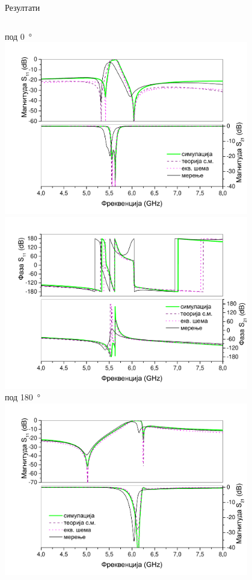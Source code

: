 \documentclass{beamer}
\begin{document}
\begin{frame}[t]{Резултати}
   \begin{columns}[c]
   \centering
   под \SI{0}{\degree}\\
   \includegraphics[width=0.8\textwidth]{sl_tsm/pod0/c_mag.pdf}\\
   \includegraphics[width=0.8\textwidth]{sl_tsm/pod0/c_faza.pdf}\\
   \centering
   под \SI{180}{\degree}\\
   \includegraphics[width=0.8\textwidth]{sl_tsm/pod180/c_mag.pdf}\\

\end{columns}
\end{frame}
\end{document}
